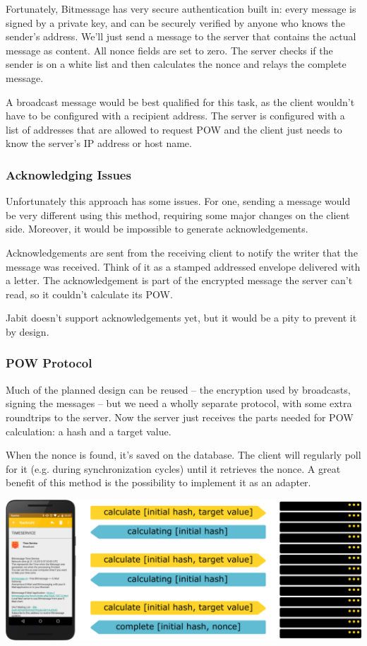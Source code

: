 \documentclass{bfh}
\begin{document}
  Fortunately, Bitmessage has very secure authentication built in: every message is signed by a private key, and can be securely verified by anyone who knows the sender's address. We'll just send a message to the server that contains the actual message as content. All nonce fields are set to zero. The server checks if the sender is on a white list and then calculates the nonce and relays the complete message.

  A broadcast message would be best qualified for this task, as the client wouldn't have to be configured with a recipient address. The server is configured with a list of addresses that are allowed to request \ac{POW} and the client just needs to know the server's IP address or host name.

  \subsubsection{Acknowledging Issues}
  Unfortunately this approach has some issues. For one, sending a message would be very different using this method, requiring some major changes on the client side. Moreover, it would be impossible to generate acknowledgements.

  Acknowledgements are sent from the receiving client to notify the writer that the message was received. Think of it as a stamped addressed envelope delivered with a letter. The acknowledgement is part of the encrypted message the server can't read, so it couldn't calculate its \ac{POW}.

  Jabit doesn't support acknowledgements yet, but it would be a pity to prevent it by design.

  \subsubsection{\ac{POW} Protocol}
  Much of the planned design can be reused -- the encryption used by broadcasts, signing the messages -- but we need a wholly separate protocol, with some extra roundtrips to the server. Now the server just receives the parts needed for \ac{POW} calculation: a hash and a target value.

  When the nonce is found, it's saved on the database. The client will regularly poll for it (e.g. during synchronization cycles) until it retrieves the nonce. A great benefit of this method is the possibility to implement it as an adapter.

  \includegraphics[width=\textwidth]{images/server_pow_protocol.pdf}
\end{document}
